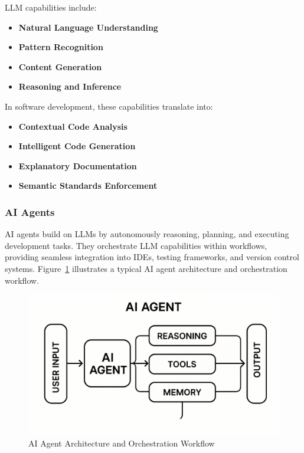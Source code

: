 \begin{spacing}{1.2}
LLM capabilities include:

\begin{itemize}
\item \textbf{Natural Language Understanding}
\item \textbf{Pattern Recognition}
\item \textbf{Content Generation}
\item \textbf{Reasoning and Inference}
\end{itemize}

In software development, these capabilities translate into:

\begin{itemize}
\item \textbf{Contextual Code Analysis}
\item \textbf{Intelligent Code Generation}
\item \textbf{Explanatory Documentation}
\item \textbf{Semantic Standards Enforcement}
\end{itemize}

\subsubsection{AI Agents}
AI agents build on LLMs by autonomously reasoning, planning, and executing development tasks. They orchestrate LLM capabilities within workflows, providing seamless integration into IDEs, testing frameworks, and version control systems. Figure~\ref{fig:ai_agent_workflow} illustrates a typical AI agent architecture and orchestration workflow.

\begin{figure}[H]
\centering
\includegraphics[scale=0.2]{Images/ai_agent.png}
\caption{AI Agent Architecture and Orchestration Workflow}
\label{fig:ai_agent_workflow}
\end{figure}


\end{spacing}

